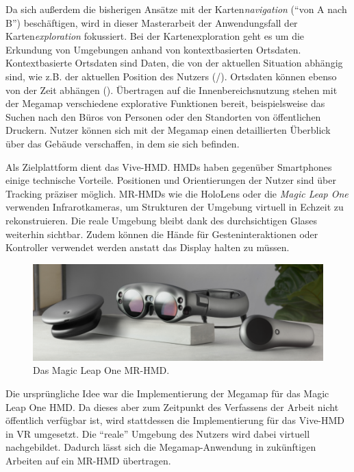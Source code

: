 Da sich außerdem die bisherigen Ansätze mit der Karten\emph{navigation} (\enquote{von A nach B}) beschäftigen, wird in dieser Masterarbeit der Anwendungsfall der Karten\emph{exploration} fokussiert.
Bei der Kartenexploration geht es um die Erkundung von Umgebungen anhand von kontextbasierten Ortsdaten.
Kontextbasierte Ortsdaten sind Daten, die von der aktuellen Situation abhängig sind, wie z.B. der aktuellen Position des Nutzers (/).
Ortsdaten können ebenso von der Zeit abhängen ().
Übertragen auf die Innenbereichsnutzung stehen mit der Megamap verschiedene explorative Funktionen bereit, beispielsweise das Suchen nach den Büros von Personen oder den Standorten von öffentlichen Druckern.
Nutzer können sich mit der Megamap einen detaillierten Überblick über das Gebäude verschaffen, in dem sie sich befinden.

Als Zielplattform dient das Vive-HMD.
HMDs haben gegenüber Smartphones einige technische Vorteile.
Positionen und Orientierungen der Nutzer sind über Tracking präziser möglich.
MR-HMDs wie die HoloLens oder die \emph{Magic Leap One} \parencite[siehe \autoref{fig:magic_leap}]{MagicLeap2018} verwenden Infrarotkameras, um Strukturen der Umgebung virtuell in Echzeit zu rekonstruieren.
Die reale Umgebung bleibt dank des durchsichtigen Glases weiterhin sichtbar.
Zudem können die Hände für Gesteninteraktionen oder Kontroller verwendet werden anstatt das Display halten zu müssen.
\begin{figure}[tb]
    \centering
    \includegraphics[width=\textwidth]{figures/magic_leap_one}
    \caption{Das Magic Leap One MR-HMD. }
    \label{fig:magic_leap}
\end{figure}

Die ursprüngliche Idee war die Implementierung der Megamap für das Magic Leap One HMD.
Da dieses aber zum Zeitpunkt des Verfassens der Arbeit nicht öffentlich verfügbar ist, wird stattdessen die Implementierung für das Vive-HMD in VR umgesetzt.
Die \enquote{reale} Umgebung des Nutzers wird dabei virtuell nachgebildet.
Dadurch lässt sich die Megamap-Anwendung in zukünftigen Arbeiten auf ein MR-HMD übertragen.

